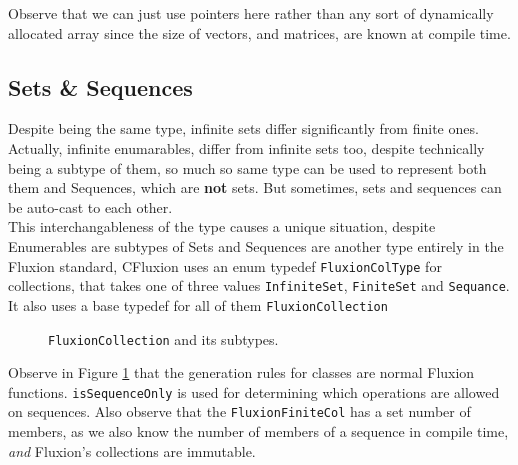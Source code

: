 \documentclass[11pt,a4paper]{article}
\newcommand{\code}[1]{\texttt{#1}}
\begin{document}
Observe that we can just use pointers here rather than any sort of dynamically allocated array since the size of vectors, and matrices, are known at compile time.

\subsection{Sets \& Sequences}

Despite being the same type, infinite sets differ significantly from finite ones. Actually, infinite enumarables, differ from infinite sets too, despite technically being a subtype of them, so much so same type can be used to represent both them and Sequences, which are \textbf{not} sets. But sometimes, sets and sequences can be auto-cast to each other.\\

This interchangableness of the type causes a unique situation, despite Enumerables are subtypes of Sets and Sequences are another type entirely in the Fluxion standard, CFluxion uses an enum typedef \code{FluxionColType} for collections, that takes one of three values \code{InfiniteSet}, \code{FiniteSet} and \code{Sequance}. It also uses a base typedef for all of them \code{FluxionCollection}\\

\begin{figure}[httb]
\begin{center}
\end{center}
\caption{\code{FluxionCollection} and its subtypes.}
\label{fig:collections}
\end{figure}

Observe in Figure \ref{fig:collections} that the generation rules for classes are normal Fluxion functions. \code{isSequenceOnly} is used for determining which operations are allowed on sequences. Also observe that the \code{FluxionFiniteCol} has a set number of members, as we also know the number of members of a sequence in compile time, \textit{and} Fluxion's collections are immutable.
\end{document}
